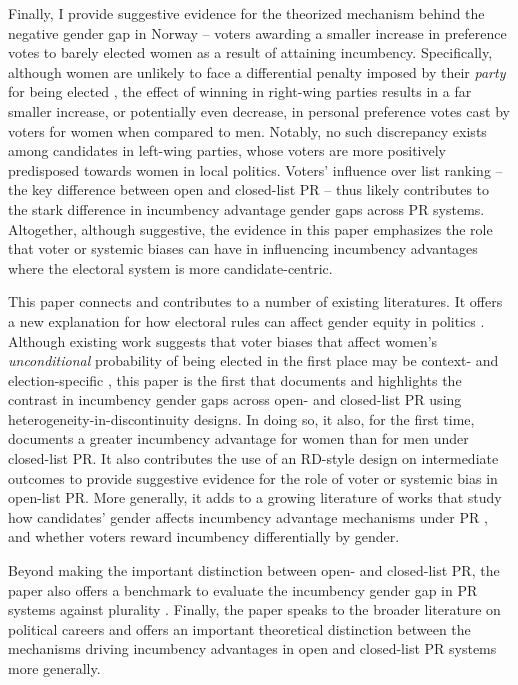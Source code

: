 \documentclass[12pt]{article}
\begin{document}
Finally, I provide suggestive evidence for the theorized mechanism behind the negative gender gap in Norway -- voters awarding a smaller increase in preference votes to barely elected women as a result of attaining incumbency.
Specifically, although women are unlikely to face a differential penalty imposed by their \emph{party} for being elected \citep{kjaer2019}, the effect of winning in right-wing parties results in a far smaller increase, or potentially even decrease, in personal preference votes cast by voters for women when compared to men. Notably, no such discrepancy exists among candidates in left-wing parties, whose voters are more positively predisposed towards women in local politics. Voters' influence over list ranking -- the key difference between open and closed-list PR -- thus likely contributes to the stark difference in incumbency advantage gender gaps across PR systems. Altogether, although suggestive, the evidence in this paper emphasizes the role that voter or systemic biases can have in influencing incumbency advantages where the electoral system is more candidate-centric.

This paper connects and contributes to a number of existing literatures. It offers a new explanation for how electoral rules can affect gender equity in politics \citep{krook2014,obrien2016,krook2018,luhiste2015}.
Although existing work suggests that voter biases that affect women's \emph{unconditional} probability of being elected in the first place may be context- and election-specific \citep{folke2016a, anzia2019, beaman2009,broockman2020,eymmoud2017}, this paper is the first that documents and highlights the contrast in incumbency gender gaps across open- and closed-list PR using heterogeneity-in-discontinuity designs. In doing so, it also, for the first time, documents a greater incumbency advantage for women than for men under closed-list PR. It also contributes the use of an RD-style design on intermediate outcomes to provide suggestive evidence for the role of voter or systemic bias in open-list PR. More generally, it adds to a growing literature of works that study how candidates' gender affects incumbency advantage mechanisms under PR \citep{schwindt-bayer2005,jankowski2019,smrek2020}, and whether voters reward incumbency differentially by gender.

Beyond making the important distinction between open- and closed-list PR, the paper also offers a benchmark to evaluate the incumbency gender gap in PR systems against plurality \citep{wasserman2020, cipullo2021, brown2019}. Finally, the paper speaks to the broader literature on political careers \citep{cirone2020,kerevel2019,folke2014} and offers an important theoretical distinction between the mechanisms driving incumbency advantages in open and closed-list PR systems more generally.
\end{document}
